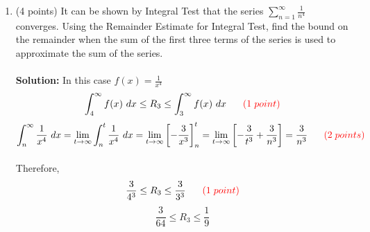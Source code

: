 \documentclass[paper=a4, fontsize=11pt]{scrartcl} %
\newcommand{\ds}{\displaystyle}
\numberwithin{equation}{section} %
\numberwithin{figure}{section} %
\numberwithin{table}{section} %
\begin{document}
\begin{enumerate}
\newpage
\item (4 points) It can be shown by Integral Test that the series $\ds\sum_{n=1}^{\infty}\frac{1}{n^4}$ converges. Using the Remainder Estimate for Integral Test, find the bound on the remainder when the sum of the first three terms of the series is used to approximate the sum of the series.\\\\
\textbf{Solution:}  In this case $\ds f(x)=\frac{1}{x^4}$
$$\ds\int_{4}^{\infty}f(x)\text{  }dx\le R_3\le\ds\int_{3}^{\infty}f(x)\text{  }dx\hspace{6mm}\textcolor{red}{(1\hspace{1mm} point )}$$
$\ds\int_{n}^{\infty}\frac{1}{x^4}\text{  }dx=\ds\lim\limits_{t\rightarrow\infty}\ds\int_{n}^{t}\frac{1}{x^4}\text{  }dx=\ds\lim\limits_{t\rightarrow\infty}\left[-\frac{3}{x^3}\right]_{n}^t=\ds\lim\limits_{t\rightarrow\infty}\left[-\frac{3}{t^3}+\frac{3}{n^3}\right]=\ds\frac{3}{n^3}\hspace{6mm}\textcolor{red}{(2\hspace{1mm} points )}$\\\\
Therefore,
$$\frac{3}{4^3}\le R_3\le\ds\frac{3}{3^3}\hspace{6mm}\textcolor{red}{(1\hspace{1mm} point )}$$
$$\frac{3}{64}\le R_3\le\ds\frac{1}{9}$$


\end{enumerate}
\end{document}
